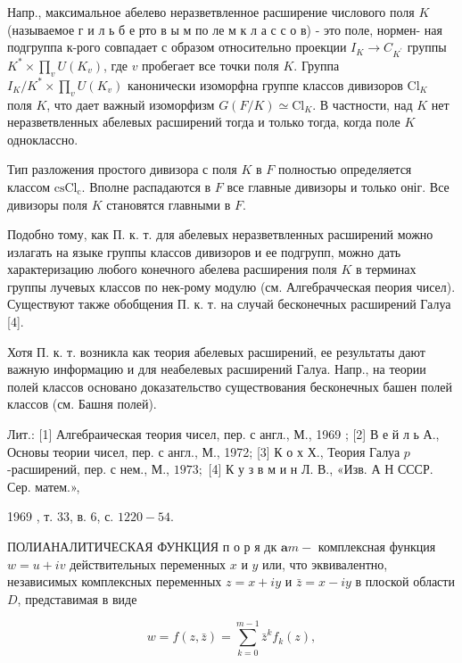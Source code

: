 \documentclass[10pt]{article}
\begin{document}
Напр., максимальное абелево неразветвленное расширение числового поля $K$ (называемое г и л ь б е рто в ы м по ле м к л а с с о в) - это поле, нормен- ная подгруппа к-рого совпадает с образом относительно проекции $I_{K} \rightarrow C_{K^{\prime}}$ группы $K^{*} \times \prod_{v} U\left(K_{v}\right)$, где $v$ пробегает все точки поля $K$. Группа $I_{K} / K^{*} \times \prod_{v} U\left(K_{v}\right)$ канонически изоморфна группе классов дивизоров $\mathrm{Cl}_{K}$ поля $K$, что дает важный изоморфизм $G(F / K) \simeq \mathrm{Cl}_{K}$. В частности, над $K$ нет неразветвленных абелевых расширений тогда и только тогда, когда поле $K$ одноклассно.



Тип разложения простого дивизора с поля $K$ в $F$ полностью определяется классом $\mathrm{c} \mathrm{s} \mathrm{Cl}_{\mathrm{c}}$. Вполне распадаются в $F$ все главные дивизоры и только оніг. Все дивизоры поля $K$ становятся главными в $F$.



Подобно тому, как П. к. т. для абелевых неразветвленных расширений можно излагать на языке группы классов дивизоров и ее подгрупп, можно дать характеризацию любого конечного абелева расширения поля $K$ в терминах группы лучевых классов по нек-рому модулю (см. Алгебрачческая пеория чисел). Существуют также обобщения П. к. т. на случай бесконечных расширений Галуа [4].



Хотя П. к. т. возникла как теория абелевых расширений, ее результаты дают важную информацию и для неабелевых расширений Галуа. Напр., на теории полей классов основано доказательство существования бесконечных башен полей классов (см. Башня полей).



Лит.: [1] Алгебраическая теория чисел, пер. с англ., М., 1969 ; [2] В е й л ь А., Основы теории чисел, пер. с англ., М., 1972; [3] К о х Х., Теория Галуа $p$-расширений, пер. с нем., М., $1973 ;$ [4] К у з в м и н Л. В., «Изв. А Н СССР. Сер. матем.»,

1969 , т. 33, в. 6, с. $1220-54$.



ПОЛИАНАЛИТИЧЕСКАЯ ФУНКЦИЯ п о р я дк $\mathbf{a} m-$ комплексная функция $w=u+i v$ действительных переменных $x$ и $y$ или, что эквивалентно, независимых комплексных переменных $z=x+i y$ и $\bar{z}=x-i y$ в плоской области $D$, представимая в виде



\[

w=f(z, \bar{z})=\sum_{k=0}^{m-1} \bar{z}^{k} f_{k}(z),

\]
\end{document}
